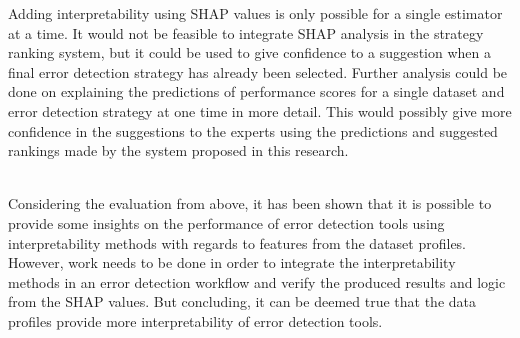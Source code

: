 Adding interpretability using SHAP values is only possible for a single estimator at a time. It would not be feasible to integrate SHAP analysis in the strategy ranking system, but it could be used to give confidence to a suggestion when a final error detection strategy has already been selected. Further analysis could be done on explaining the predictions of performance scores for a single dataset and error detection strategy at one time in more detail. This would possibly give more confidence in the suggestions to the experts using the predictions and suggested rankings made by the system proposed in this research. 

~\\Considering the evaluation from above, it has been shown that it is possible to provide some insights on the performance of error detection tools using interpretability methods with regards to features from the dataset profiles. However, work needs to be done in order to integrate the interpretability methods in an error detection workflow and verify the produced results and logic from the SHAP values. But concluding, it can be deemed true that the data profiles provide more interpretability of error detection tools. 